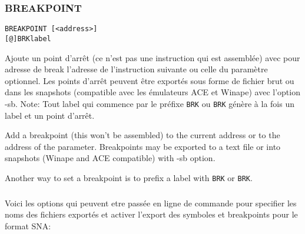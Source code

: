 \subsubsection{BREAKPOINT}\label{BREAKPOINT}

\begin{verbatim}
BREAKPOINT [<address>]
[@]BRKlabel
\end{verbatim}

\begin{xfr}

Ajoute un point d'arrêt (ce n'est pas une instruction qui est assemblée) avec pour adresse de break l'adresse de l'instruction suivante ou celle du paramètre optionnel. Les points d'arrêt peuvent être exportés sous forme de fichier brut ou dans les snapshots (compatible avec les émulateurs ACE et Winape) avec l'option -sb.
Note: Tout label qui commence par le préfixe \texttt{BRK} ou \texttt{\at BRK} génère à la fois un label et un point d'arrêt.
\end{xfr}

\begin{xen}
Add a breakpoint (this won't be assembled) to the current address or to the address of the parameter. Breakpoints may be exported to a text file or into snapshots (Winape and ACE compatible) with -sb option.

Another way to set a breakpoint is to prefix a label with \texttt{BRK} or \texttt{\at BRK}.
\end{xen}

\subsubsection{}    \label{options_export_cpc}
\begin{xfr}
Voici les options qui peuvent etre passée en ligne de commande pour specifier les noms des fichiers exportés et activer l'export des symboles et breakpoints pour le format SNA:
\end{xfr}


